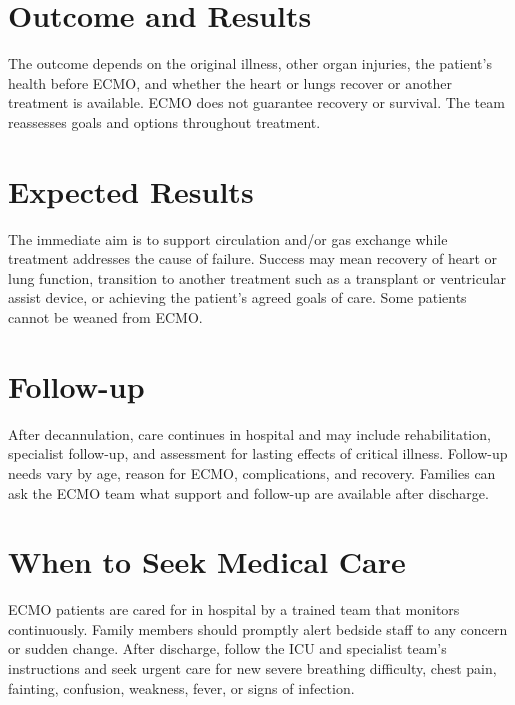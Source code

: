 \section*{Outcome and Results}
The outcome depends on the original illness, other organ injuries, the patient's health before ECMO, and whether the heart or lungs recover or another treatment is available. ECMO does not guarantee recovery or survival. The team reassesses goals and options throughout treatment.

\section*{Expected Results}
The immediate aim is to support circulation and/or gas exchange while treatment addresses the cause of failure. Success may mean recovery of heart or lung function, transition to another treatment such as a transplant or ventricular assist device, or achieving the patient's agreed goals of care. Some patients cannot be weaned from ECMO.

\section*{Follow-up}
After decannulation, care continues in hospital and may include rehabilitation, specialist follow-up, and assessment for lasting effects of critical illness. Follow-up needs vary by age, reason for ECMO, complications, and recovery. Families can ask the ECMO team what support and follow-up are available after discharge.

\section*{When to Seek Medical Care}
ECMO patients are cared for in hospital by a trained team that monitors continuously. Family members should promptly alert bedside staff to any concern or sudden change. After discharge, follow the ICU and specialist team's instructions and seek urgent care for new severe breathing difficulty, chest pain, fainting, confusion, weakness, fever, or signs of infection.

